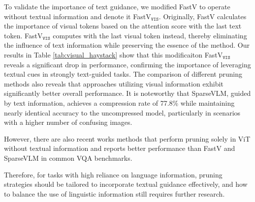 


To validate the importance of text guidance, we modified FastV to operate without textual information and denote it FastV$_{\texttt{VIS}}$. Originally, FastV calculates the importance of visual tokens based on the attention score with the last text token. FastV$_{\texttt{VIS}}$ computes with the last visual token instead, thereby eliminating the influence of text information while preserving the essence of the method. Our results in Table \ref{tab:visual_haystack} show that this modificaiton FastV$_{\texttt{VIS}}$ reveals a significant drop in performance, confirming the importance of leveraging textual cues in strongly text-guided tasks. The comparison of different pruning methods also reveals that approaches utilizing visual information exhibit significantly better overall performance. It is noteworthy that SparseVLM, guided by text information, achieves a compression rate of 77.8\% while maintaining nearly identical accuracy to the uncompressed model, particularly in scenarios with a higher number of confusing images.

However, there are also recent works methods \citep{zhang2024clsattentionneedtrainingfree, liu2025compressionglobalguidancetrainingfree} that perform pruning solely in ViT without textual information and reports better performance than FastV and SparseVLM in common VQA benchmarks. 

Therefore, for tasks with high reliance on language information, pruning strategies should be tailored to incorporate textual guidance effectively, and how to balance the use of linguistic information still requires further research.






